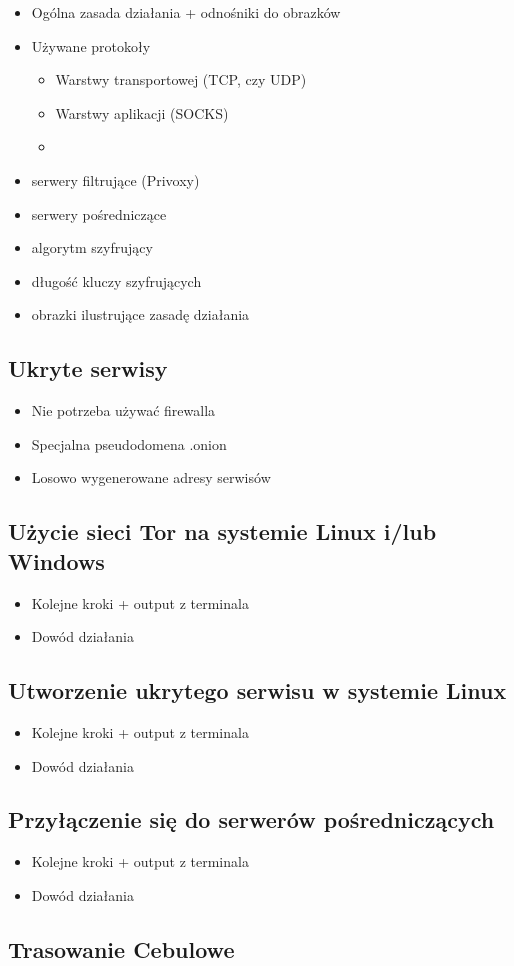 \begin{itemize}
 \item Ogólna zasada działania + odnośniki do obrazków
 \item Używane protokoły
 \begin{itemize}
  \item Warstwy transportowej (TCP, czy UDP)
  \item Warstwy aplikacji (SOCKS)
  \item 
 \end{itemize}
 \item serwery filtrujące (Privoxy)
 \item serwery pośredniczące
 \item algorytm szyfrujący
 \item długość kluczy szyfrujących
 \item obrazki ilustrujące zasadę działania
\end{itemize}

\subsection{Ukryte serwisy}
\begin{itemize}
 \item Nie potrzeba używać firewalla
 \item Specjalna pseudodomena .onion
 \item Losowo wygenerowane adresy serwisów
\end{itemize}

\subsection{Użycie sieci Tor na systemie Linux i/lub Windows}
\begin{itemize}
 \item Kolejne kroki + output z terminala
 \item Dowód działania
\end{itemize}

\subsection{Utworzenie ukrytego serwisu w systemie Linux}
\begin{itemize}
 \item Kolejne kroki + output z terminala
 \item Dowód działania
\end{itemize}

\subsection{Przyłączenie się do serwerów pośredniczących}
\begin{itemize}
 \item Kolejne kroki + output z terminala
 \item Dowód działania
\end{itemize}

\subsection{Trasowanie Cebulowe}
